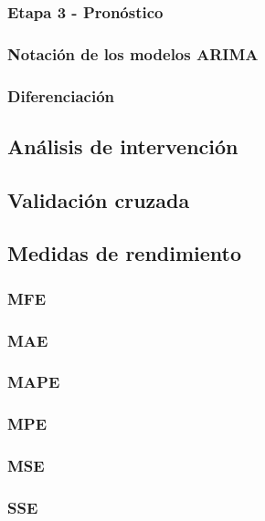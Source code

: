\documentclass[
]{article}
\begin{document}
\subsubsection{Etapa 3 - Pronóstico}

\subsubsection{Notación de los modelos ARIMA}

\subsubsection{Diferenciación}

\subsection{Análisis de intervención}

\subsection{Validación cruzada}

\subsection{Medidas de rendimiento}

\subsubsection{MFE}

\subsubsection{MAE}

\subsubsection{MAPE}

\subsubsection{MPE}

\subsubsection{MSE}

\subsubsection{SSE}
\end{document}
